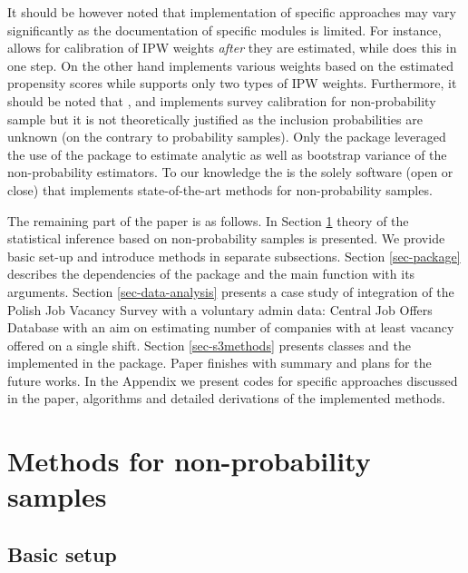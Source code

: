 \documentclass[
]{jss}
\begin{document}
It should be however noted that implementation of specific approaches
may vary significantly as the documentation of specific modules is
limited. For instance,  allows for calibration of IPW
weights \textit{after} they are estimated, while  does
this in one step. On the other hand  implements various
weights based on the estimated propensity scores while 
supports only two types of IPW weights. Furthermore, it should be noted
that ,  and  implements survey
calibration for non-probability sample but it is not theoretically
justified as the inclusion probabilities are unknown (on the contrary to
probability samples). Only the  package leveraged the
use of the  package to estimate analytic as well as
bootstrap variance of the non-probability estimators. To our knowledge
the  is the solely software (open or close) that
implements state-of-the-art methods for non-probability samples.

The remaining part of the paper is as follows. In Section
\ref{sec-methods} theory of the statistical inference based on
non-probability samples is presented. We provide basic set-up and
introduce methods in separate subsections. Section \ref{sec-package}
describes the dependencies of the package and the main function with its
arguments. Section \ref{sec-data-analysis} presents a case study of
integration of the Polish Job Vacancy Survey with a voluntary admin
data: Central Job Offers Database with an aim on estimating number of
companies with at least vacancy offered on a single shift. Section
\ref{sec-s3methods} presents classes and the 
implemented in the package. Paper finishes with summary and plans for
the future works. In the Appendix we present codes for specific
approaches discussed in the paper, algorithms and detailed derivations
of the implemented methods.

\section{Methods for non-probability samples}\label{sec-methods}

\subsection{Basic setup}\label{basic-setup}
\end{document}
